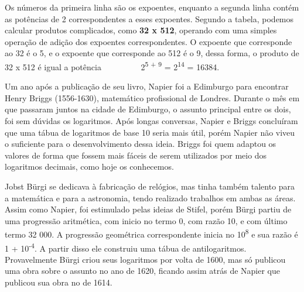 \documentclass[12pt]{article}
\begin{document}
\begin{enumerate}[label*={\fontsize{14pt}{14pt}\selectfont \textbf{\arabic*.}}]
\begin{table}[H]
\begin{tabular}{p{0.07in}p{0.07in}p{0.07in}p{0.14in}p{0.14in}p{0.14in}p{0.21in}p{0.21in}p{0.21in}p{0.29in}p{0.29in}p{0.29in}p{0.29in}p{0.37in}p{0.37in}}
\end{tabular}
 \end{table}




\vspace{\baselineskip}
\begin{justify}
\tab Os números da primeira linha são os expoentes, enquanto a segunda linha contém as potências de 2 correspondentes a esses expoentes. Segundo a tabela, podemos calcular produtos complicados, como \textbf{32 x 512}, operando com uma simples operação de adição dos expoentes correspondentes. O expoente que corresponde ao 32 é o 5, e o expoente que corresponde ao 512 é o 9, dessa forma, o produto de 32 x 512 é igual a potência \ \ \ \ \ \ \ \ \  2\textsuperscript{5 + 9 }= 2\textsuperscript{14} = 16384.
\end{justify}\par

\begin{justify}
\tab Um ano após a publicação de seu livro, Napier foi a Edimburgo para encontrar Henry Briggs (1556-1630), matemático profissional de Londres. Durante o mês em que passaram juntos na cidade de Edimburgo, o assunto principal entre os dois, foi sem dúvidas os logaritmos. Após longas conversas, Napier e Briggs concluíram que uma tábua de logaritmos de base 10 seria mais útil, porém Napier não viveu o suficiente para o desenvolvimento dessa ideia. Briggs foi quem adaptou os valores de forma que fossem mais fáceis de serem utilizados por meio dos logaritmos decimais, como hoje os conhecemos.
\end{justify}\par

\begin{justify}
\tab Jobst Bürgi se dedicava à fabricação de relógios, mas tinha também talento para a matemática e para a astronomia, tendo realizado trabalhos em ambas as áreas. Assim como Napier, foi estimulado pelas ideias de Stifel, porém Bürgi partiu de uma progressão aritmética, com inicio no termo 0, com razão 10, e com último termo 32 000. A progressão geométrica correspondente inicia no 10\textsuperscript{8} e sua razão é 1 + 10\textsuperscript{-4}. A partir disso ele construiu uma tábua de antilogaritmos. Provavelmente Bürgi criou seus logaritmos por volta de 1600, mas só publicou uma obra sobre o assunto no ano de 1620, ficando assim atrás de Napier que publicou sua obra no de 1614.
\end{justify}\par


\end{enumerate}
\end{document}
